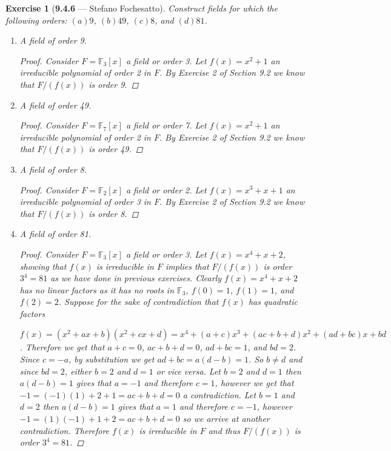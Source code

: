 \documentclass[12pt]{amsart}
\newtheorem{exercise}[theorem]{Exercise}
\theoremstyle{remark}
\newcommand{\FF}{{\mathbb F}}
\theoremstyle{mycomment}
\begin{document}
\begin{exercise}[\textbf{9.4.6} --- Stefano Fochesatto] Construct fields for which the following orders: $(a)9$, $(b)49$, $(c)8$, and $(d)81$.
  \begin{enumerate}
    \item[(a)] A field of order 9.
    \begin{proof}
      Consider $F = \FF_3[x]$ a field or order 3. Let $f(x) = x^2 + 1$ an irreducible polynomial of order 2 in $F$. By Exercise 2 of Section 9.2 we know that $F/(f(x))$ is order 9.
    \end{proof}
    \vspace{.15in}

    \item[(b)] A field of order 49.
    \begin{proof}
      Consider $F = \FF_7[x]$ a field or order 7. Let $f(x) = x^2 + 1$ an irreducible polynomial of order 2 in $F$. By Exercise 2 of Section 9.2 we know that $F/(f(x))$ is order 49.
    \end{proof}
    \vspace{.15in}

    \item[(c)] A field of order 8.
    \begin{proof}
      Consider $F = \FF_2[x]$ a field or order 2. Let $f(x) = x^3 + x + 1$ an irreducible polynomial of order 3 in $F$. By Exercise 2 of Section 9.2 we know that $F/(f(x))$ is order 8.
    \end{proof}
    \vspace{.15in}


    \item[(d)] A field of order 81.
    \begin{proof}
      Consider $F = \FF_3[x]$ a field or order 3. Let $f(x) = x^4 + x + 2$, showing that $f(x)$ is irreducible in $F$
      implies that $F/(f(x))$ is order $3^4 = 81$ as we have done in previous exercises. Clearly  $f(x) = x^4 + x + 2$ has no linear factors as it has no roots in $\FF_3$, $f(0) = 1$, $f(1) = 1$, and $f(2) = 2$. Suppose for the sake of contradiction that  $f(x)$ has quadratic factors

      $f(x) = (x^2 + ax + b)(x^2 + cx + d) = x^4 + (a + c)x^3 + (ac + b + d)x^2 + (ad + bc)x + bd$. Therefore we get that $a + c = 0$, $ac + b + d = 0$, $ad + bc = 1$, and $bd = 2$. Since $c = -a$, by substitution we get $ad + bc = a(d - b) = 1$. So $b \neq d$ and since $bd = 2$, either $b = 2$ and $d = 1$ or vice versa.
      Let $b = 2$ and $d = 1$ then $a(d - b) = 1$ gives that $a = -1$ and therefore $c = 1$, however we get that 
      $-1 = (-1)(1) + 2 + 1 = ac + b + d = 0$ a contradiction. Let $b = 1$ and $d = 2$ then $a(d - b) = 1$ gives that $a = 1$ and therefore $c = -1$, however $-1 = (1)(-1) + 1 + 2 = ac + b + d = 0$ so we arrive at another contradiction. Therefore $f(x)$ is irreducible in $F$ and thus $F/(f(x))$ is order $3^4 = 81$.
    \end{proof}
  \end{enumerate}

\end{exercise}
\vspace{.5in}
\end{document}
